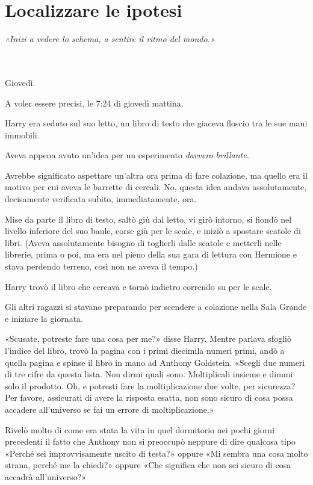 
\chapter{Localizzare le ipotesi}
\label{capitolo:17}

\emph{«Inizi a vedere lo schema, a sentire il ritmo del mondo.»}

~\\
~\\

Giovedì.

A voler essere precisi, le 7:24 di giovedì mattina.

Harry era seduto sul suo letto, un libro di testo che giaceva floscio tra le sue mani immobili.

Aveva appena avuto un’idea per un esperimento \textit{davvero brillante.}

Avrebbe significato aspettare un’altra ora prima di fare colazione, ma quello era il motivo per cui aveva le barrette di cereali. No, questa idea andava assolutamente, decisamente verificata subito, immediatamente, ora.

Mise da parte il libro di testo, saltò giù dal letto, vi girò intorno, si fiondò nel livello inferiore del suo baule, corse giù per le scale, e iniziò a spostare scatole di libri. (Aveva assolutamente bisogno di toglierli dalle scatole e metterli nelle librerie, prima o poi, ma era nel pieno della sua gara di lettura con Hermione e stava perdendo terreno, così non ne aveva il tempo.)

Harry trovò il libro che cercava e tornò indietro correndo su per le scale.

Gli altri ragazzi si stavano preparando per scendere a colazione nella Sala Grande e iniziare la giornata.

«Scusate, potreste fare una cosa per me?» disse Harry. Mentre parlava sfogliò l’indice del libro, trovò la pagina con i primi diecimila numeri primi, andò a quella pagina e spinse il libro in mano ad Anthony Goldstein. «Scegli due numeri di tre cifre da questa lista. Non dirmi quali sono. Moltiplicali insieme e dimmi solo il prodotto. Oh, e potresti fare la moltiplicazione due volte, per sicurezza? Per favore, assicurati di avere la risposta esatta, non sono sicuro di cosa possa accadere all’universo se fai un errore di moltiplicazione.»

Rivelò molto di come era stata la vita in quel dormitorio nei pochi giorni precedenti il fatto che Anthony non si preoccupò neppure di dire qualcosa tipo «Perché sei improvvisamente uscito di testa?» oppure «Mi sembra una cosa molto strana, perché me la chiedi?» oppure «Che significa che non sei sicuro di cosa accadrà all’universo?»

